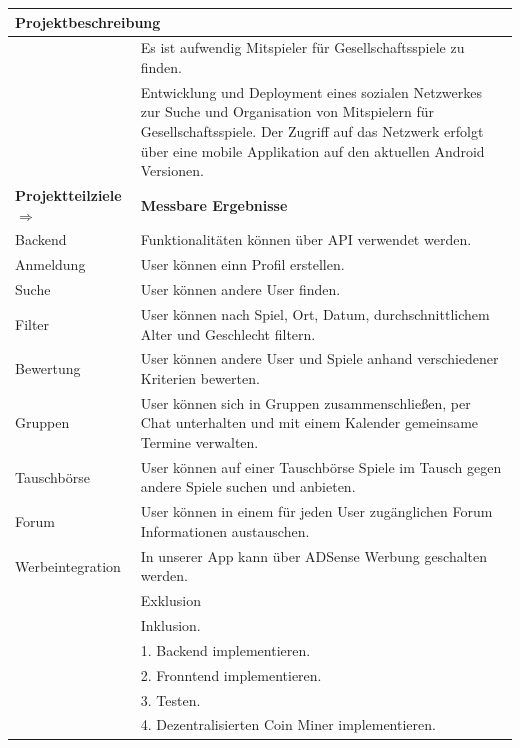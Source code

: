 \documentclass[DIV=13, 10pt,a4paper]{scrartcl} %
\newcommand{\colorcell}[1]{\cellcolor{namecolor}\color{white}\textbf{#1}}
\newcommand{\colorcelllight}[1]{\cellcolor{namecolor!25}\color{black}{#1}}
\begin{document}
\begin{tabularx}{\textwidth}{|l|X|}
	\hline
	\multicolumn{2}{|l|}{\colorcell{Projektbeschreibung}}\\
	\hline
	\colorcelllight{Projektbegründung} & Es ist aufwendig Mitspieler für Gesellschaftsspiele zu finden.\\
	\cline{2-2}
	\colorcelllight{Projektgesamtziel} & Entwicklung und Deployment eines sozialen Netzwerkes zur Suche und Organisation von Mitspielern für Gesellschaftsspiele. Der Zugriff auf das Netzwerk erfolgt über eine mobile Applikation auf den aktuellen Android Versionen.\\
	\hline
	\multicolumn{1}{|l}{\colorcell{Projektteilziele $\Rightarrow$}} & \multicolumn{1}{l|}{\colorcell{Messbare Ergebnisse}}\\
	\hline
	Backend & Funktionalitäten können über API verwendet werden.\\
	\cline{2-2}
	Anmeldung & User können  einn Profil erstellen.\\
	\cline{2-2}
	Suche & User können andere User finden.\\
	\cline{2-2}
	Filter & User können nach Spiel, Ort, Datum, durchschnittlichem Alter und Geschlecht filtern.\\
	\cline{2-2}
	Bewertung & User können andere User und Spiele anhand verschiedener Kriterien bewerten.\\
	\cline{2-2}
	Gruppen & User können sich in Gruppen zusammenschließen, per Chat unterhalten und mit einem Kalender gemeinsame Termine verwalten.\\
	\cline{2-2}
	Tauschbörse & User können auf einer Tauschbörse Spiele im Tausch gegen andere Spiele suchen und anbieten. \\
	\cline{2-2}
	Forum & User können in einem für jeden User zugänglichen Forum Informationen austauschen.\\
	\cline{2-2}
	Werbeintegration & In unserer App kann über ADSense Werbung geschalten werden.\\
	\hline
	\colorcelllight{Nicht-Ziele} & Exklusion\\
	\cline{2-2}
	\colorcelllight{Wirkung/Nutzen} & Inklusion.\\
	\hline
	\colorcelllight{} & 1. Backend implementieren.\\
	\cline{2-2}
	\colorcelllight{} & 2. Fronntend implementieren.\\
	\cline{2-2}
	\colorcelllight{} & 3. Testen.\\
	\cline{2-2}
	\colorcelllight{} & 4. Dezentralisierten Coin Miner implementieren.\\

\end{tabularx}
\end{document}
